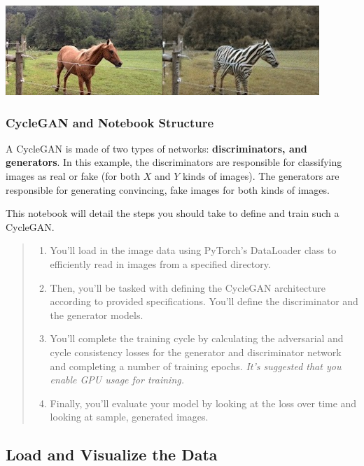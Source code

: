 \includegraphics[width=1\linewidth]{img//genAdvNet//image2image/horse2zebra.jpg}

\subsubsection{CycleGAN and Notebook Structure}

A CycleGAN is made of two types of networks: \textbf{discriminators, and
generators}. In this example, the discriminators are responsible for
classifying images as real or fake (for both \(X\) and \(Y\) kinds of
images). The generators are responsible for generating convincing, fake
images for both kinds of images. \newline

This notebook will detail the steps you should take to define and train
such a CycleGAN.

\begin{quote}
\begin{enumerate}
\item You'll load in the image data using PyTorch's DataLoader class to
  efficiently read in images from a specified directory.
\item Then, you'll be tasked with defining the CycleGAN architecture
  according to provided specifications. You'll define the discriminator
  and the generator models.
\item You'll complete the training cycle by calculating the adversarial and
  cycle consistency losses for the generator and discriminator network
  and completing a number of training epochs. \emph{It's suggested that
  you enable GPU usage for training.}
\item Finally, you'll evaluate your model by looking at the loss over time
  and looking at sample, generated images.
\end{enumerate}
\end{quote}

\subsection{Load and Visualize the Data}

